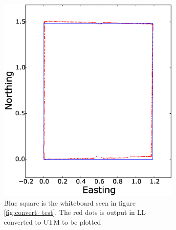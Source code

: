 \begin{figure}[H]
    \centering
    \begin{subfigure}[b]{0.45\textwidth}
        \includegraphics[width=\textwidth]{graphics/coordincate_conversion_test.eps}
        \caption{Blue square is the whiteboard seen in figure \ref{fig:convert_test}. The red dots is output in \ac{LL} converted to UTM to be plotted}
        \label{fig:coordinate_test_polot}
    \end{subfigure}
    ~ %
    \begin{subfigure}[b]{0.45\textwidth}

\end{subfigure}
\end{figure}
